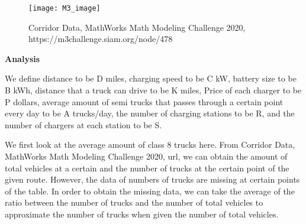 \renewcommand{\thefigure}{1}
\begin{figure}[h]
  \begin{center}
    \texttt{[image: M3\_image]}
  \end{center}
  \caption{Corridor Data, MathWorks Math Modeling Challenge 2020, https://m3challenge.siam.org/node/478}
  \label{fig:1}
\end{figure}

\noindent
\textbf{Analysis}

We define distance to be D miles, charging speed to be C kW, battery size to be B kWh, distance that a truck can drive to be K miles, Price of each charger to be P dollars, average amount of semi trucks that passes through a certain point every day to be A trucks/day, the number of charging stations to be R, and the number of chargers at each station to be S.

We first look at the average amount of class 8 trucks here. From Corridor Data, MathWorks Math Modeling Challenge 2020, url, we can obtain the amount of total vehicles at a certain and the number of trucks at the certain point of the given route. However, the data of numbers of trucks are missing at certain points of the table. In order to obtain the missing data, we can take the average of the ratio between the number of trucks and the number of total vehicles to approximate the number of trucks when given the number of total vehicles.


